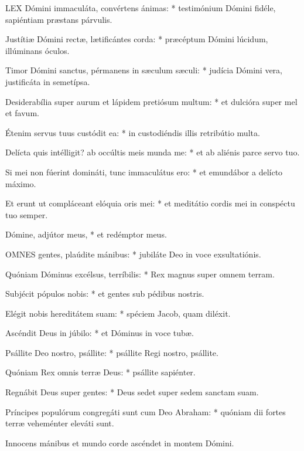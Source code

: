 
\lettrine[lines=2]{L}{EX} Dómini immaculáta, convértens ánimas: * testimónium Dómini fidéle, sapiéntiam præstans párvulis.

Justítiæ Dómini rectæ, lætificántes corda: * præcéptum Dómini lúcidum, illúminans óculos.

Timor Dómini sanctus, pérmanens in sæculum sæculi: * judícia Dómini vera, justificáta in semetípsa.

Desiderabília super aurum et lápidem pretiósum multum: * et dulcióra super mel et favum.

Étenim servus tuus custódit ea: * in custodiéndis illis retribútio multa.

Delícta quis intélligit? ab occúltis meis munda me: * et ab aliénis parce servo tuo.

Si mei non fúerint domináti, tunc immaculátus ero: * et emundábor a delícto máximo.

Et erunt ut compláceant elóquia oris mei: * et meditátio cordis mei in conspéctu tuo semper.

Dómine, adjútor meus, * et redémptor meus.



\lettrine[lines=2]{O}{MNES} gentes, plaúdite mánibus: * jubiláte Deo in voce exsultatiónis.

Quóniam Dóminus excélsus, terríbilis: * Rex magnus super omnem terram.

Subjécit pópulos nobis: * et gentes sub pédibus nostris.

Elégit nobis hereditátem suam: * spéciem Jacob, quam diléxit.

Ascéndit Deus in júbilo: * et Dóminus in voce tubæ.

Psállite Deo nostro, psállite: * psállite Regi nostro, psállite.

Quóniam Rex omnis terræ Deus: * psállite sapiénter.

Regnábit Deus super gentes: * Deus sedet super sedem sanctam suam.

Príncipes populórum congregáti sunt cum Deo Abraham: * quóniam dii fortes terræ veheménter eleváti sunt.


  Innocens mánibus et mundo corde ascéndet in montem Dómini.

